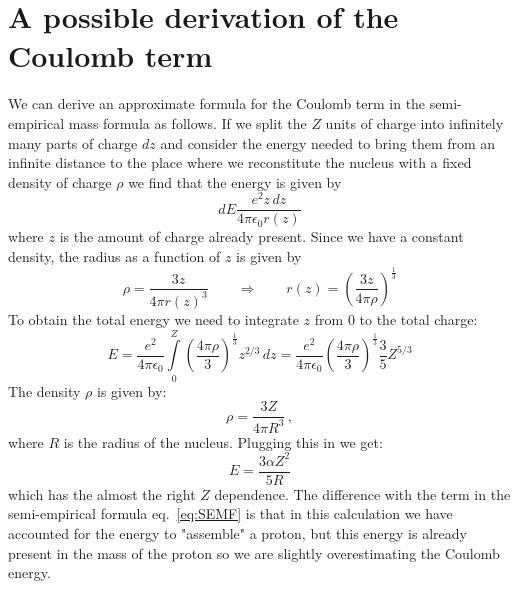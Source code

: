 \documentclass[12pt]{article}
\begin{document}
\pagebreak
\appendix
\section{A possible derivation of the Coulomb term}
We can derive an approximate formula for the Coulomb term in the semi-empirical mass formula as follows. If we split the $Z$ units of charge into infinitely many parts of charge $dz$ and consider the energy needed to bring them from an infinite distance to the place where we reconstitute the nucleus with a fixed density of charge $\rho$ we find that the energy is given by 
\[dE\frac{e^2 z\,dz}{4\pi\epsilon_0 r(z)}\]
where $z$ is the amount of charge already present. Since we have a constant density, the radius as a function of $z$ is given by
\[\rho=\frac{3 z}{4\pi r(z)^3}\qquad \Rightarrow \qquad r(z)=\left(\frac{3z}{4\pi\rho}\right)^{\frac{1}{3}}\]
To obtain the total energy we need to integrate $z$ from 0 to the total charge:
\[E=\frac{e^2}{4\pi\epsilon_0}\int\limits_0^{Z}\left(\frac{4\pi\rho}{3}\right)^{\frac{1}{3}}z^{2/3}\,dz=\frac{e^2}{4\pi\epsilon_0} \left(\frac{4\pi\rho}{3}\right)^{\frac{1}{3}}\frac{3}{5}Z^{5/3}\] 
The density $\rho$ is given by:
\[\rho=\frac{3Z}{4\pi R^3}\,,\]
where $R$ is the radius of the nucleus. Plugging this in we get:
\[E=\frac{3\alpha Z^2}{5 R}\] 
which has the almost the right $Z$ dependence. The difference with the term in the semi-empirical formula eq.~\ref{eq:SEMF} is that in this calculation we have accounted for the energy to "assemble" a proton, but this energy is already present in the mass of the proton so we are slightly overestimating the Coulomb energy.   






\end{document}
